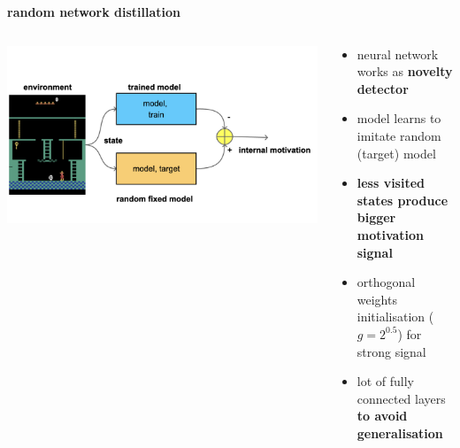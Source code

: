\documentclass{beamer}
\begin{document}
\begin{frame}{\bf random network distillation}
  
  \begin{columns}

    \begin{column}{0.5\textwidth}
      \includegraphics[scale=0.1]{../diagrams/rnd/rnd.png}
    \end{column}

    \begin{column}{0.5\textwidth}
      \begin{itemize}
        \item neural network works as {\bf novelty detector}
        \item model learns to imitate random (target) model
        \item {\bf less visited states produce bigger motivation signal}
        \item orthogonal weights initialisation ($g=2^{0.5}$) for strong signal
        \item lot of fully connected layers {\bf to avoid generalisation}
      \end{itemize}
    \end{column}


  \end{columns}
  
\end{frame}
  
\end{document}
